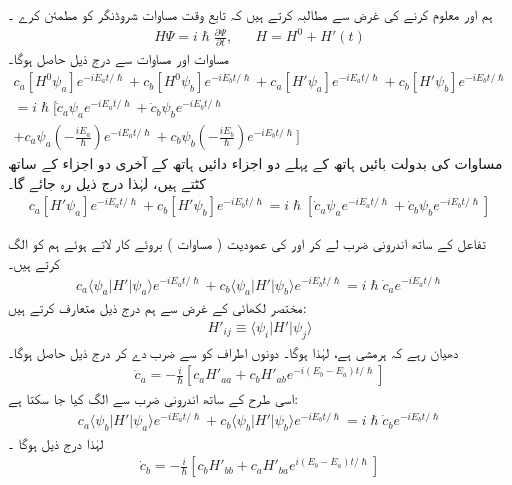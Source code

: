 ہم  اور  معلوم کرنے کی غرض سے مطالبہ کرتے ہیں کہ  تابع وقت مساوات شروڈنگر کو مطمئن کرے ۔
\begin{align}\label{مساوات_تابع_مضطرب_مطمئن}
	H\Psi=i\hslash\frac{\partial\Psi}{\partial t},&&H=H^0+H'(t)
\end{align}
مساوات  اور مساوات   سے درج ذیل حاصل ہوگا۔
\begin{multline*}
	c_a[H^0\psi_a]e^{-iE_at/\hslash}+c_b[H^0\psi_b]e^{-iE_bt/\hslash}+c_a[H'\psi_a]e^{-iE_at/\hslash}+c_b[H'\psi_b]e^{-iE_bt/\hslash} \\
	=i\hslash\Big[\dot{c}_a\psi_ae^{-iE_at/\hslash}+\dot{c}_b\psi_be^{-iE_bt/\hslash}\\
	+c_a\psi_a\left(-\frac{iE_a}{\hslash}\right)e^{-iE_at/\hslash}+c_b\psi_b\left(-\frac{iE_b}{\hslash}\right)e^{-iE_bt/\hslash}\Big]
\end{multline*}
مساوات   کی بدولت بائیں ہاتھ کے پہلے دو اجزاء  دائیں ہاتھ کے آخری دو اجزاء کے ساتھ کٹتے  ہیں،  لہٰذا درج ذیل رہ جائے  گا۔
\begin{align}
	c_a[H'\psi_a]e^{-iE_at/\hslash}+c_b[H'\psi_b]e^{-iE_bt/\hslash}=i\hslash\left[\dot{c}_a\psi_ae^{-iE_at/\hslash}+\dot{c}_b\psi_be^{-iE_bt/\hslash}\right]
\end{align}

تفاعل  کے ساتھ اندرونی ضرب لے کر  اور  کی عمودیت ( مساوات )  بروئے کار لاتے ہوئے ہم   کو الگ کرتے ہیں۔
\begin{align*}
	c_a\langle\psi_a| H'|\psi_a\rangle e^{-iE_at/\hslash}+c_b\langle\psi_a| H'|\psi_b\rangle e^{-iE_bt/\hslash}=i\hslash\dot{c}_ae^{-iE_at/\hslash}
\end{align*}
مختصر لکھائی کے غرض سے ہم درج ذیل متعارف کرتے ہیں:
\begin{align}
	H'_{ij}\equiv\langle\psi_i| H'|\psi_j\rangle
\end{align}
دھیان رہے کہ   ہرمشی ہے،  لہٰذا  ہوگا۔ دونوں اطراف کو  سے ضرب دے کر درج ذیل حاصل ہوگا۔
\begin{align}\label{مساوات_تابع_مضطرب_تحویلی_شرح_الف}
	\dot{c}_a=-\frac{i}{\hslash}\left[c_aH'_{aa}+c_bH'_{ab}e^{-i(E_b-E_a)t/\hslash}\right]
\end{align}
اسی طرح  کے ساتھ اندرونی ضرب سے  الگ کیا جا سکتا ہے:
\begin{align*}
	c_a\langle\psi_b| H'|\psi_a\rangle e^{-iE_at/\hslash}+c_b\langle\psi_b| H'|\psi_b\rangle e^{-iE_bt/\hslash}=i\hslash\dot{c}_be^{-iE_bt/\hslash}
\end{align*}
لہٰذا درج ذیل ہوگا ۔
\begin{align}\label{مساوات_تابع_مضطرب_تحویلی_شرح_ب}
	\dot{c}_b=-\frac{i}{\hslash}\left[c_bH'_{bb}+c_aH'_{ba}e^{i(E_b-E_a)t/\hslash}\right]
\end{align}

